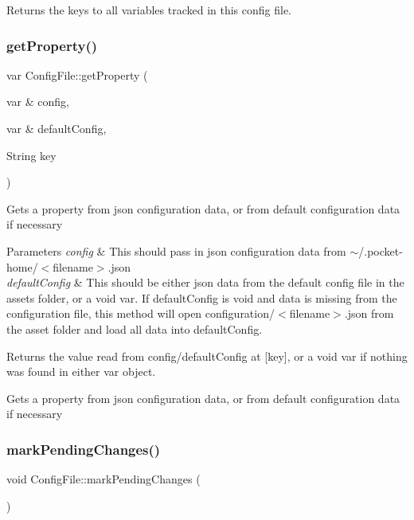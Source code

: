 \begin{DoxyReturn}{Returns}
the keys to all variables tracked in this config file. 
\end{DoxyReturn}
\mbox{\label{classConfigFile_a7e1391339b37bed32c642f638a845499}} 
\subsubsection{\texorpdfstring{get\+Property()}{getProperty()}}
{\footnotesize\ttfamily var Config\+File\+::get\+Property (\begin{DoxyParamCaption}\item[{var \&}]{config,  }\item[{var \&}]{default\+Config,  }\item[{String}]{key }\end{DoxyParamCaption})\hspace{0.3cm}{\ttfamily [protected]}}

Gets a property from json configuration data, or from default configuration data if necessary


\begin{DoxyParams}{Parameters}
{\em config} & This should pass in json configuration data from $\sim$/.pocket-\/home/$<$filename$>$.json\\
\hline
{\em default\+Config} & This should be either json data from the default config file in the assets folder, or a void var. If default\+Config is void and data is missing from the configuration file, this method will open configuration/$<$filename$>$.json from the asset folder and load all data into default\+Config.\\
\hline
\end{DoxyParams}
\begin{DoxyReturn}{Returns}
the value read from config/default\+Config at \mbox{[}key\mbox{]}, or a void var if nothing was found in either var object.
\end{DoxyReturn}
Gets a property from json configuration data, or from default configuration data if necessary \mbox{\label{classConfigFile_a4dc13463864c0b90aef8d6bc5699d674}} 
\subsubsection{\texorpdfstring{mark\+Pending\+Changes()}{markPendingChanges()}}
{\footnotesize\ttfamily void Config\+File\+::mark\+Pending\+Changes (\begin{DoxyParamCaption}{ }\end{DoxyParamCaption})\hspace{0.3cm}{\ttfamily [protected]}}

